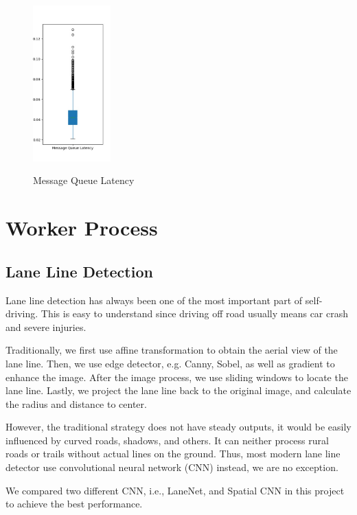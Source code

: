 \documentclass[runningheads]{llncs}
\begin{document}
\begin{figure}
    \centering
    \includegraphics[height=6cm]{reference/latency}
    \label{fig:MQLatency}
    \caption{Message Queue Latency}
\end{figure}


\section{Worker Process}

\subsection{Lane Line Detection}
Lane line detection has always been one of the most 
important part of self-driving. This is easy to understand 
since driving off road usually means car crash and severe 
injuries. 

Traditionally, we first use affine transformation to obtain 
the aerial view of the lane line. Then, we use edge 
detector, e.g. Canny, Sobel, as well as gradient to enhance 
the image. After the image process, we use sliding windows 
to locate the lane line. Lastly, we project the lane line 
back to the original image, and calculate the radius and 
distance to center. 

However, the traditional strategy does not have steady 
outputs, it would be easily influenced by curved roads, 
shadows, and others. It can neither process rural roads or 
trails without actual lines on the ground. Thus, most 
modern lane line detector use convolutional neural network 
(CNN) instead, we are no exception. 

We compared two different CNN, i.e., LaneNet, and 
Spatial CNN in this project to achieve the best performance. 
\end{document}
